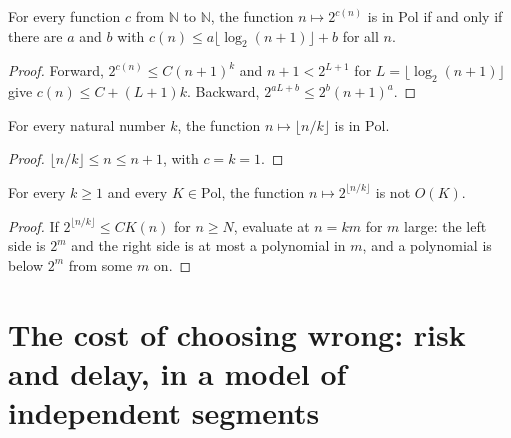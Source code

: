 \begin{theorem}
  \label{thm:search-dos-pow-pol}
  \leanok
  For every function $c$ from $\mathbb{N}$ to $\mathbb{N}$, the function $n \mapsto 2^{c(n)}$ is in
  $\mathrm{Pol}$ if and only if there are $a$ and $b$ with $c(n) \le a \lfloor \log_2 (n+1) \rfloor + b$
  for all $n$.
  \own{}
\end{theorem}

\begin{proof}
  \leanok
  Forward, $2^{c(n)} \le C (n+1)^k$ and $n + 1 < 2^{L+1}$ for $L = \lfloor \log_2(n+1) \rfloor$ give
  $c(n) \le C + (L+1)k$. Backward, $2^{aL + b} \le 2^b (n+1)^a$.
\end{proof}

\begin{theorem}
  \label{thm:search-rala-certificado}
  \leanok
  For every natural number $k$, the function $n \mapsto \lfloor n / k \rfloor$ is in $\mathrm{Pol}$.
  \own{}
\end{theorem}

\begin{proof}
  \leanok
  $\lfloor n/k \rfloor \le n \le n + 1$, with $c = k = 1$.
\end{proof}

\begin{theorem}
  \label{thm:search-rala-escapa}
  \leanok
  For every $k \ge 1$ and every $K \in \mathrm{Pol}$, the function $n \mapsto 2^{\lfloor n / k \rfloor}$
  is not $O(K)$.
  \own{}
\end{theorem}

\begin{proof}
  \leanok
  If $2^{\lfloor n/k \rfloor} \le C K(n)$ for $n \ge N$, evaluate at $n = km$ for $m$ large: the
  left side is $2^m$ and the right side is at most a polynomial in $m$, and a polynomial is below
  $2^m$ from some $m$ on.
\end{proof}

\section{The cost of choosing wrong: risk and delay, in a model of independent segments}
\label{sec:search-cost-error}

